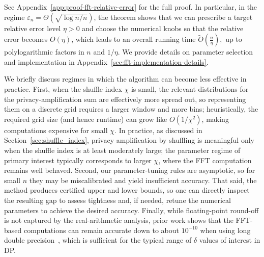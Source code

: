 \documentclass{article}
\theoremstyle{plain}
\theoremstyle{definition}
\begin{document}
See Appendix~\ref{app:proof-fft-relative-error} for the full proof. In particular, in the regime
$\varepsilon_n = \Theta(\sqrt{\log n / n})$, the theorem
shows that we can prescribe a target relative error level
$\eta>0$ and choose the numerical knobs so that the relative error becomes $O(\eta)$, which leads to an overall running time
$
  \widetilde O\!\left(\frac{n}{\eta}\right),
$
up to polylogarithmic factors in $n$ and $1/\eta$.
We provide details on parameter selection and implementation in Appendix~\ref{sec:fft-implementation-details}.


We briefly discuss regimes in which the algorithm can become less effective in practice. 
First, when the shuffle index $\chi$ is small, the relevant distributions for the privacy-amplification sum are effectively more spread out, so representing them on a discrete grid requires a larger window and more bins; heuristically, the required grid size (and hence runtime) can grow like $O(1/\chi^2)$, making computations expensive for small $\chi$.
In practice, as discussed in Section~\ref{sec:shuffle_index}, privacy amplification by shuffling is meaningful only when the shuffle index is at least moderately large; the parameter regime of primary interest typically corresponds to larger $\chi$, where the FFT computation remains well behaved.
Second, our parameter-tuning rules are asymptotic, so for small $n$ they may be miscalibrated and yield insufficient accuracy.
That said, the method produces certified upper and lower bounds, so one can directly inspect the resulting gap to assess tightness and, if needed, retune the numerical parameters to achieve the desired accuracy. 
Finally, while floating-point round-off is not captured by the real-arithmetic analysis, prior work shows that the FFT-based computations can remain accurate down to about $10^{-10}$ when using long double precision~\cite{gopiNumericalCompositionDifferential2021}, which is sufficient for the typical range of $\delta$ values of interest in DP.
\end{document}
